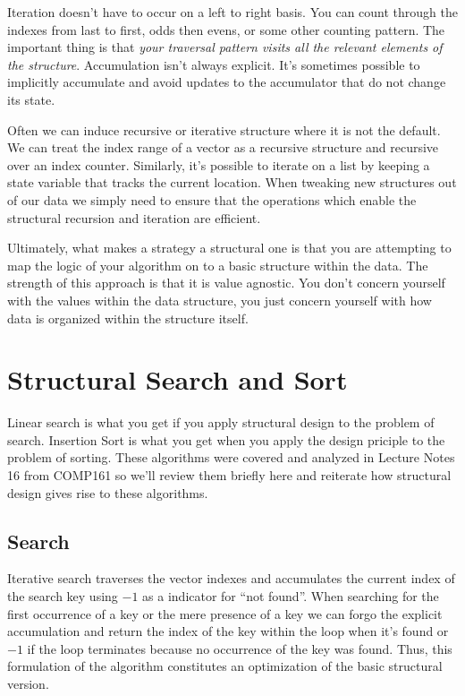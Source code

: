 \documentclass[nobib]{tufte-handout}
\begin{document}
Iteration doesn't have to occur on a left to right basis. You can count through the indexes from last to first, odds then evens, or some other counting pattern. The important thing is that \textit{your traversal pattern visits all the relevant elements of the structure}.  Accumulation isn't always explicit. It's sometimes possible to implicitly accumulate and avoid updates to the accumulator that do not change its state.

Often we can induce recursive or iterative structure where it is not the default. We can treat the index range of a vector as a recursive structure and recursive over an index counter. Similarly, it's possible to iterate on a list by keeping a state variable that tracks the current location. When tweaking new structures out of our data we simply need to ensure that the operations which enable the structural recursion and iteration are efficient.

Ultimately, what makes a strategy a structural one is that you are attempting to map the logic of your algorithm on to a basic structure within the data. The strength of this approach is that it is value agnostic. You don't concern yourself with the values within the data structure, you just concern yourself with how data is organized within the structure itself.

\section{Structural Search and Sort}

Linear search is what you get if you apply structural design to the problem of search. Insertion Sort is what you get when you apply the design priciple to the problem of sorting. These algorithms were covered and analyzed in Lecture Notes 16 from COMP161 so we'll review them  briefly here and reiterate how structural design gives rise to these algorithms.

\subsection{Search}

Iterative search traverses the vector indexes and accumulates the current index of the search key using $-1$ as a indicator for ``not found''. When searching for the first occurrence of a key or the mere presence of a key we can forgo the explicit accumulation and return the index of the key within the loop when it's found or $-1$ if the loop terminates because no occurrence of the key was found. Thus, this formulation of the algorithm constitutes an optimization of the basic structural version.
\end{document}
